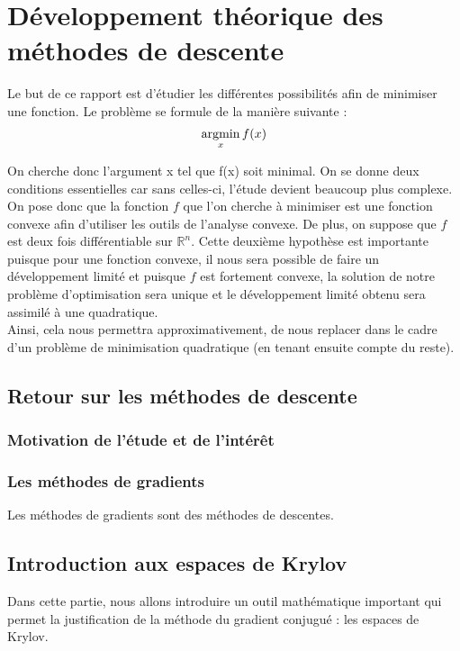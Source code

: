 \chapter{Développement théorique des méthodes de descente}
Le but de ce rapport est d'étudier les différentes possibilités afin de minimiser une fonction. Le problème se formule de la manière suivante : 
\begin{equation}
\argmin_x f(x)
\end{equation}

On cherche donc l'argument x tel que f(x) soit minimal. On se donne deux conditions essentielles car sans celles-ci, l'étude devient beaucoup plus complexe. \\

On pose donc que la fonction $f$ que l'on cherche à minimiser est une fonction convexe afin d'utiliser les outils de l'analyse convexe. De plus, on suppose que $f$ est deux fois différentiable sur $\mathbb{R}^n$. Cette deuxième hypothèse est importante puisque pour une fonction convexe, il nous sera possible de faire un développement limité et puisque $f$ est fortement convexe, la solution de notre problème d'optimisation sera unique et le développement limité obtenu sera assimilé à une quadratique.\\

 Ainsi, cela nous permettra approximativement, de nous replacer dans le cadre d'un problème de minimisation quadratique (en tenant ensuite compte du reste).

\section{Retour sur les méthodes de descente}
\subsection{Motivation de l'étude et de l'intérêt}
\subsection{Les méthodes de gradients}
Les méthodes de gradients sont des méthodes de descentes. 


\section{Introduction aux espaces de Krylov}
Dans cette partie, nous allons introduire un outil mathématique important qui permet la justification de la méthode du gradient conjugué : les espaces de Krylov. 

